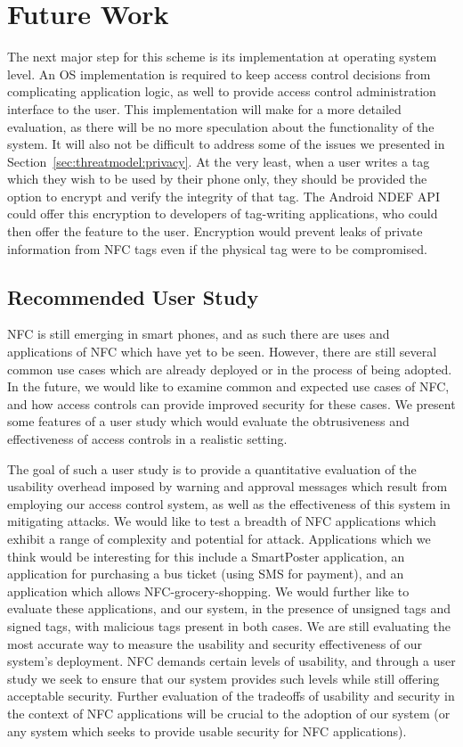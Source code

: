 \documentclass[12pt]{article}
\begin{document}
\section{Future Work}
\label{sec:futurework}
The next major step for this scheme is its implementation at operating system level.
An OS implementation is required to keep access control decisions from complicating application logic, as well to provide access control administration interface to the user.
This implementation will make for a more detailed evaluation, as there will be no more speculation about the functionality of the system.
It will also not be difficult to address some of the issues we presented in Section~\ref{sec:threatmodel:privacy}.
At the very least, when a user writes a tag which they wish to be used by their phone only, they should be provided the option to encrypt and verify the integrity of that tag.
The Android NDEF API could offer this encryption to developers of tag-writing applications, who could then offer the feature to the user.
Encryption would prevent leaks of private information from NFC tags even if the physical tag were to be compromised.


\subsection{Recommended User Study}
NFC is still emerging in smart phones, and as such there are uses and applications of NFC which have yet to be seen.
However, there are still several common use cases which are already deployed or in the process of being adopted.
In the future, we would like to examine common and expected use cases of NFC, and how access controls can provide improved security for these cases.
We present some features of a user study which would evaluate the obtrusiveness and effectiveness of access controls in a realistic setting.

The goal of such a user study is to provide a quantitative evaluation of the usability overhead imposed by warning and approval messages which result from employing our access control system, as well as the effectiveness of this system in mitigating attacks.
We would like to test a breadth of NFC applications which exhibit a range of complexity and potential for attack.
Applications which we think would be interesting for this include a SmartPoster application, an application for purchasing a bus ticket (using SMS for payment), and an application which allows NFC-grocery-shopping.
We would further like to evaluate these applications, and our system, in the presence of unsigned tags and signed tags, with malicious tags present in both cases.
We are still evaluating the most accurate way to measure the usability and security effectiveness of our system's deployment.
NFC demands certain levels of usability, and through a user study we seek to ensure that our system provides such levels while still offering acceptable security.
Further evaluation of the tradeoffs of usability and security in the context of NFC applications will be crucial to the adoption of our system (or any system which seeks to provide usable security for NFC applications).
\end{document}
